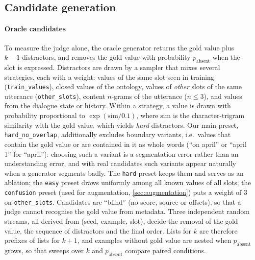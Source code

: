 \subsection{Candidate generation}
\label{sec:candidates}

\paragraph{Oracle candidates} To measure the judge alone, the oracle generator returns the gold value plus $k-1$ distractors, and removes the gold value with probability $p_{\text{absent}}$ when the slot is expressed. Distractors are drawn by a sampler that mixes several strategies, each with a weight: values of the same slot seen in training (\texttt{train\_values}), closed values of the ontology, values of \emph{other} slots of the same utterance (\texttt{other\_slots}), content $n$-grams of the utterance ($n\le 3$), and values from the dialogue state or history. Within a strategy, a value is drawn with probability proportional to $\exp(\mathrm{sim}/0.1)$, where $\mathrm{sim}$ is the character-trigram similarity with the gold value, which yields \emph{hard} distractors. Our main preset, \texttt{hard\_no\_overlap}, additionally excludes boundary variants, i.e.\ values that contain the gold value or are contained in it as whole words (``on april'' or ``april 1'' for ``april''): choosing such a variant is a segmentation error rather than an understanding error, and with real candidates such variants appear naturally when a generator segments badly. The \texttt{hard} preset keeps them and serves as an ablation; the \texttt{easy} preset draws uniformly among all known values of all slots; the \texttt{confusion} preset (used for augmentation, \cref{sec:augmentation}) puts a weight of 3 on \texttt{other\_slots}. Candidates are ``blind'' (no score, source or offsets), so that a judge cannot recognise the gold value from metadata. Three independent random streams, all derived from (seed, example, slot), decide the removal of the gold value, the sequence of distractors and the final order. Lists for $k$ are therefore prefixes of lists for $k+1$, and examples without gold value are nested when $p_{\text{absent}}$ grows, so that sweeps over $k$ and $p_{\text{absent}}$ compare paired conditions.

